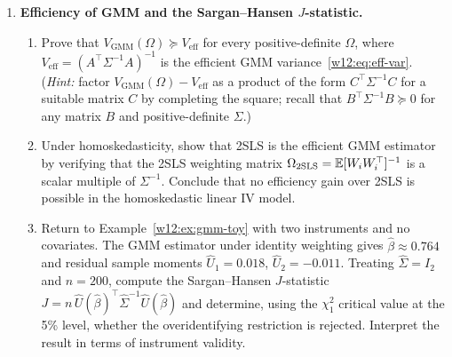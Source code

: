 \documentclass[master.tex]{subfiles}
\begin{document}
\begin{enumerate}
\item \textbf{Efficiency of GMM and the Sargan--Hansen $J$-statistic.}
  \begin{enumerate}
    \item Prove that $V_{\mathrm{GMM}}(\Omega) \succeq V_{\mathrm{eff}}$
      for every positive-definite $\Omega$, where
      $V_{\mathrm{eff}} = (A^\top\Sigma^{-1}A)^{-1}$ is the efficient
      GMM variance~\eqref{w12:eq:eff-var}.  (\emph{Hint:} factor
      $V_{\mathrm{GMM}}(\Omega) - V_{\mathrm{eff}}$ as a product of the
      form $C^\top \Sigma^{-1} C$ for a suitable matrix $C$ by
      completing the square; recall that $B^\top\Sigma^{-1}B \succeq 0$
      for any matrix $B$ and positive-definite $\Sigma$.)
    \item Under homoskedasticity, show that 2SLS is the efficient
      GMM estimator by verifying that the 2SLS weighting matrix
      $\Omega_{\mathrm{2SLS}} = \mathbb{E}[W_i W_i^\top]^{-1}$ is a scalar
      multiple of $\Sigma^{-1}$.  Conclude that no efficiency gain
      over 2SLS is possible in the homoskedastic linear IV model.
    \item Return to Example~\ref{w12:ex:gmm-toy} with two instruments
      and no covariates.  The GMM estimator under identity weighting
      gives $\hat\beta \approx 0.764$ and residual sample moments
      $\hat{U}_1 = 0.018$, $\hat{U}_2 = -0.011$.  Treating
      $\hat\Sigma = I_2$ and $n = 200$, compute the Sargan--Hansen
      $J$-statistic $J = n\,\hat{U}(\hat\beta)^\top\hat\Sigma^{-1}
      \hat{U}(\hat\beta)$ and determine, using the $\chi^2_1$ critical
      value at the 5\% level, whether the overidentifying restriction
      is rejected.  Interpret the result in terms of instrument
      validity.
  \end{enumerate}


\end{enumerate}
\end{document}
